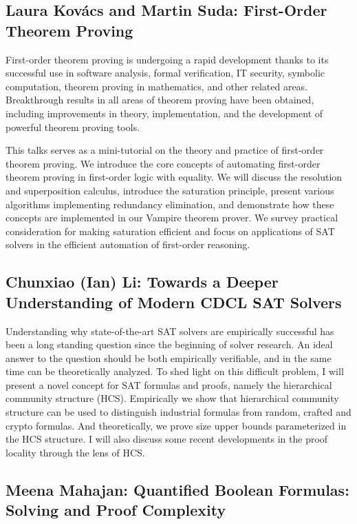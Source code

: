 \documentclass[11pt]{article}
\begin{document}
\subsection*{Laura Kovács and Martin Suda: First-Order Theorem Proving}\label{Kovacs}

First-order theorem proving is undergoing a rapid development thanks to its successful use in software analysis, formal verification, IT security, symbolic computation, theorem proving in mathematics, and other related areas. Breakthrough results in all areas of theorem proving have been obtained, including improvements in theory, implementation, and the development of powerful theorem proving tools.

This talks serves as a mini-tutorial on the theory and practice of first-order theorem proving. We introduce the core concepts of automating first-order theorem proving in first-order logic with equality. We will discuss the resolution and superposition calculus, introduce the saturation principle, present various algorithms implementing redundancy elimination, and demonstrate how these concepts are implemented in our Vampire theorem prover. We survey practical consideration for making saturation efficient and focus on applications of SAT solvers in the efficient automation of first-order reasoning.


\subsection*{Chunxiao (Ian) Li: Towards a Deeper Understanding of Modern CDCL SAT Solvers}\label{Li}

Understanding why state-of-the-art SAT solvers are empirically successful has been a long standing question since the beginning of solver research. An ideal answer to the question should be both empirically verifiable, and in the same time can be theoretically analyzed. To shed light on this difficult problem, I will present a novel concept for SAT formulas and proofs, namely the hierarchical community structure (HCS). Empirically we show that hierarchical community structure can be used to distinguish industrial formulas from random, crafted and crypto formulas. And theoretically, we prove size upper bounds parameterized in the HCS structure. I will also discuss some recent developments in the proof locality through the lens of HCS.


\subsection*{Meena Mahajan: Quantified Boolean Formulas: Solving and Proof Complexity}\label{Mahajan}
\end{document}
